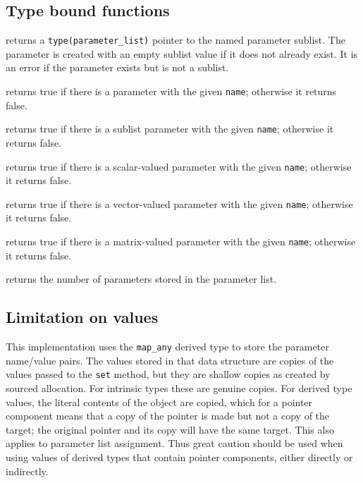 \documentclass[11pt]{article}
\begin{document}
\subsection{Type bound functions}
\begin{description}[style=nextline]\setlength{\itemsep}{0pt}
\item[\texttt{sublist(name \Lbr,stat \Lbr,errmsg\Rbr\Rbr)}]
  returns a \texttt{type(parameter_list)} pointer to the named parameter
  sublist.  The parameter is created with an empty sublist value if it
  does not already exist.  It is an error if the parameter exists but is
  not a sublist.
\item[\texttt{is_parameter(name)}]
  returns true if there is a parameter with the given \texttt{name};
  otherwise it returns false.
\item[\texttt{is_sublist(name)}]
  returns true if there is a sublist parameter with the given \texttt{name};
  otherwise it returns false.
\item[\texttt{is_scalar(name)}]
  returns true if there is a scalar-valued parameter with the given \texttt{name};
  otherwise it returns false.
\item[\texttt{is_vector(name)}]
  returns true if there is a vector-valued parameter with the given \texttt{name};
  otherwise it returns false.
\item[\texttt{is_matrix(name)}]
  returns true if there is a matrix-valued parameter with the given \texttt{name};
  otherwise it returns false.
\item[\texttt{count()}]
  returns the number of parameters stored in the parameter list.
\end{description}

\subsection{Limitation on values}
This implementation uses the \texttt{map_any} derived type to store the
parameter name/value pairs.  The values stored in that data structure are
copies of the values passed to the \texttt{set} method, but they are shallow
copies as created by sourced allocation.  For intrinsic types these are
genuine copies.  For derived type values, the literal contents of the object
are copied, which for a pointer component means that a copy of the pointer
is made but not a copy of the target; the original pointer and its copy will
have the same target.  This also applies to parameter list assignment.
Thus great caution should be used when using values of derived types that
contain pointer components, either directly or indirectly.
\end{document}
